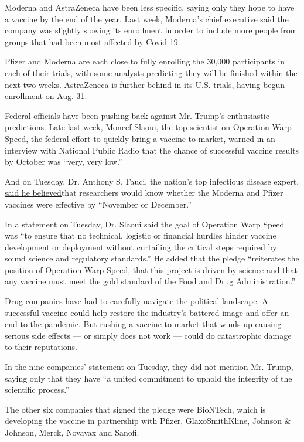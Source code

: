 Moderna and AstraZeneca have been less specific, saying only they hope
to have a vaccine by the end of the year. Last week, Moderna's chief
executive said the company was slightly slowing its enrollment in order
to include more people from groups that had been most affected by
Covid-19.

Pfizer and Moderna are each close to fully enrolling the 30,000
participants in each of their trials, with some analysts predicting they
will be finished within the next two weeks. AstraZeneca is further
behind in its U.S. trials, having begun enrollment on Aug. 31.

Federal officials have been pushing back against Mr. Trump's
enthusiastic predictions. Late last week, Moncef Slaoui, the top
scientist on Operation Warp Speed, the federal effort to quickly bring a
vaccine to market, warned in an interview with National Public Radio
that the chance of successful vaccine results by October was ``very,
very low.''

And on Tuesday, Dr. Anthony S. Fauci, the nation's top infectious
disease expert,
\href{https://www.pbs.org/newshour/health/watch-live-judy-woodruff-interviews-fauci-during-virtual-health-research-forum}{said
he believed}that researchers would know whether the Moderna and Pfizer
vaccines were effective by ``November or December.''

In a statement on Tuesday, Dr. Slaoui said the goal of Operation Warp
Speed was ``to ensure that no technical, logistic or financial hurdles
hinder vaccine development or deployment without curtailing the critical
steps required by sound science and regulatory standards.'' He added
that the pledge ``reiterates the position of Operation Warp Speed, that
this project is driven by science and that any vaccine must meet the
gold standard of the Food and Drug Administration.''

Drug companies have had to carefully navigate the political landscape. A
successful vaccine could help restore the industry's battered image and
offer an end to the pandemic. But rushing a vaccine to market that winds
up causing serious side effects --- or simply does not work --- could do
catastrophic damage to their reputations.

In the nine companies' statement on Tuesday, they did not mention Mr.
Trump, saying only that they have ``a united commitment to uphold the
integrity of the scientific process.''

The other six companies that signed the pledge were BioNTech, which is
developing the vaccine in partnership with Pfizer, GlaxoSmithKline,
Johnson \& Johnson, Merck, Novavax and Sanofi.

